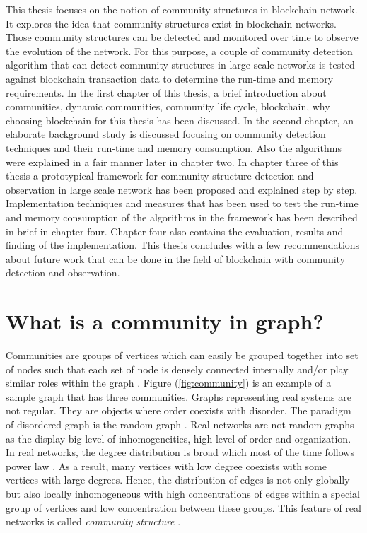 This thesis focuses on the notion of community structures in blockchain network. It explores the idea that community structures exist in blockchain networks. Those community structures can be detected and monitored over time to observe the evolution of the network. For this purpose, a couple of community detection algorithm that can detect community structures in large-scale networks is tested against blockchain transaction data to determine the run-time and memory requirements. In the first chapter of this thesis, a brief introduction about communities, dynamic communities, community life cycle, blockchain, why choosing blockchain for this thesis has been discussed. In the second chapter, an elaborate background study is discussed focusing on community detection techniques and their run-time and memory consumption. Also the algorithms were explained in a fair manner later in chapter two. In chapter three of this thesis a prototypical framework for community structure detection and observation in large scale network has been proposed and explained step by step. Implementation techniques and measures that has been used to test the run-time and memory consumption of the algorithms in the framework has been described in brief in chapter four. Chapter four also contains the evaluation, results and finding of the implementation. This thesis concludes with a few recommendations about future work that can be done in the field of blockchain with community detection and observation.

\section{What is a community in graph?}\label{community_in_graph}
Communities are groups of vertices which can easily be grouped together into set of nodes such that each set of node is densely connected internally and/or play similar roles within the graph \cite{ref-6}. Figure (\ref{fig:community}) is an example of a sample graph that has three communities. Graphs representing real systems are not regular. They are objects where order coexists with disorder. The paradigm of disordered graph is the random graph \cite{ref-21}. Real networks are not random  graphs as the display big level of inhomogeneities, high level of order and organization. In real networks, the degree distribution is broad which most of the time follows power law \cite{ref-6}. As a result, many vertices with low degree coexists with some vertices with large degrees. Hence, the distribution of edges is not only globally but also locally inhomogeneous with high concentrations of edges within a special group of vertices and low concentration between these groups. This feature of real networks is called \textit{community structure} \cite{ref-1}.

